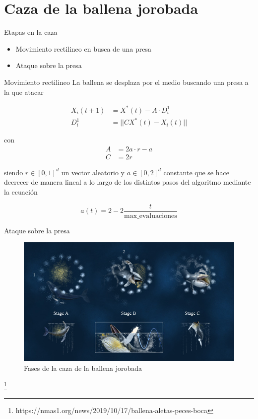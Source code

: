 \documentclass{beamer}
\begin{document}
\section{Caza de la ballena jorobada}

\begin{frame}{Etapas en la caza}
    \begin{itemize}
        \item Movimiento rectilineo en busca de una presa
        \item Ataque sobre la presa
    \end{itemize}
\end{frame}

\begin{frame}{Movimiento rectilineo}
    La ballena se desplaza por el medio buscando una presa a la que atacar

    \begin{align}
        X_i(t+1) & = X^*(t) - A\cdot D_i^1  \label{eq:1}\\
        D^1_i & = ||CX^*(t)-X_i(t)||    
    \end{align}

    \pause
    con 
    \begin{align*}
        A &= 2a\cdot r - a \\
        C &= 2r
    \end{align*}

\end{frame}
\begin{frame}
    siendo $r \in [0,1]^d$ un vector aleatorio y $a\in [0,2]^d$ constante que se hace
    decrecer de manera lineal a lo largo de los distintos pasos del algoritmo
    mediante la ecuación

    \[
        a(t) = 2-2\frac{t}{\text{max\_evaluaciones}}  
    \]
    
\end{frame}
\begin{frame}{Ataque sobre la presa}
    
    \begin{figure}[H]
    \centering
    \includegraphics[width=\textwidth]{images/caza.jpg}
    \caption{Fases de la caza de la ballena jorobada}
    \end{figure}    
    \footnote{https://nmas1.org/news/2019/10/17/ballena-aletas-peces-boca}
    
\end{frame}
\end{document}
